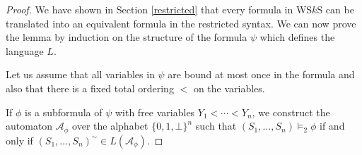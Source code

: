 \begin{proof}
 We have shown in Section \ref{restricted} that every formula in WS$k$S can be
 translated into an equivalent formula in the restricted syntax. We can now
 prove the lemma by induction on the structure of the formula $\psi$ which
 defines the language $L$.

Let us assume that all variables in $\psi$ are bound at most once in the formula
and also that there is a fixed total ordering $<$ on the variables.

If $\phi$ is a subformula of $\psi$ with free variables $Y_1 < \cdots < Y_n$, we
construct the automaton $\mathcal{A}_\phi$ over the alphabet $\{0,1,\bot\}^n$
such that $(S_1,\ldots,S_n) \models_2 \phi$ if and only if
$(S_1,\ldots,S_n)^\sim \in L(\mathcal{A}_\phi)$.
\end{proof}

